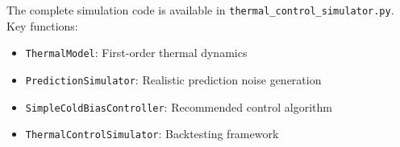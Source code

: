 \documentclass[11pt,letterpaper]{article}
\begin{document}
The complete simulation code is available in \texttt{thermal\_control\_simulator.py}. Key functions:

\begin{itemize}
    \item \texttt{ThermalModel}: First-order thermal dynamics
    \item \texttt{PredictionSimulator}: Realistic prediction noise generation
    \item \texttt{SimpleColdBiasController}: Recommended control algorithm
    \item \texttt{ThermalControlSimulator}: Backtesting framework
\end{itemize}
\end{document}
